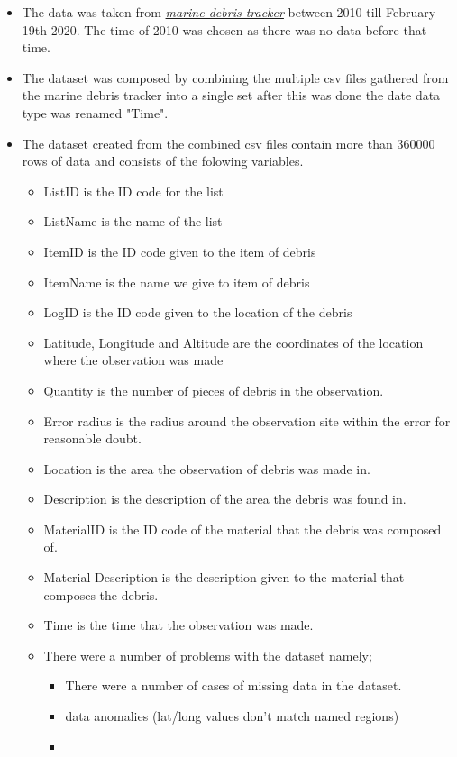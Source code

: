 \documentclass[10pt]{article}\usepackage[]{graphicx}\usepackage[]{color}
\begin{document}
\begin{itemize}

\item The data was taken from  \textit{\href{http://marinedebris.engr.uga.edu/newmap/}{marine debris tracker}} between 2010 till February 19th 2020. The time of 2010 was chosen as there was no data before that time.
\item The dataset was composed by combining the multiple csv files gathered from the marine debris tracker into a single set after this was done the date data type was renamed "Time". 
\item The dataset created from the combined csv files contain more than 360000 rows of data and consists of the folowing variables. 
  \begin{itemize}
  \item ListID is the ID code for the list
  \item ListName is the name of the list
  \item ItemID is the ID code given to the item of debris
  \item ItemName is the name we give to item of debris
  \item LogID is the ID code given to the location of the debris
  \item Latitude, Longitude and Altitude are the coordinates of the location where the observation was made
  \item Quantity is the number of pieces of debris in the observation.
  \item Error radius is the radius around the observation site within the error for reasonable doubt.
  \item Location is the area the observation of debris was made in.
  \item Description is the description of the area the debris was found in.
  \item MaterialID is the ID code of the material that the debris was composed of. 
  \item Material Description is the description given to the material that composes the debris.
  \item Time is the time that the observation was made. 
\item There were a number of problems with the dataset namely;
  \begin{itemize}
  \item There were a number of cases of missing data in the dataset. 
  \item data anomalies (lat/long values don't match named regions)
  \item 
  \end{itemize}
\end{itemize}
\end{itemize}
\end{document}
